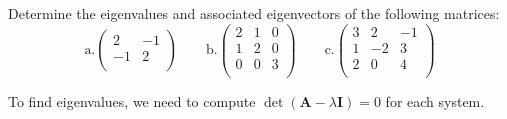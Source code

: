 \documentclass[12pt, answers]{exam}
\newcommand{\ve}[1]{\ensuremath{\mathbf{#1}}}
\begin{document}
\begin{questions}
\vspace*{3em}
\addpoints
\question[10] Determine the eigenvalues and associated eigenvectors of the following matrices:
%
\renewcommand{\aaa}{2}
\renewcommand{\aab}{-1}
\renewcommand{\aba}{-1}
\renewcommand{\abb}{2}
\renewcommand{\baa}{2}
\renewcommand{\bab}{1}
\renewcommand{\bac}{0}
\renewcommand{\bba}{1}
\renewcommand{\bbb}{2}
\renewcommand{\bbc}{0}
\renewcommand{\bca}{0}
\renewcommand{\bcb}{0}
\renewcommand{\bcc}{3}
\renewcommand{\caa}{3}
\renewcommand{\cab}{2}
\renewcommand{\cac}{-1}
\renewcommand{\cba}{1}
\renewcommand{\cbb}{-2}
\renewcommand{\cbc}{3}
\renewcommand{\cca}{2}
\renewcommand{\ccb}{0}
\renewcommand{\ccc}{4}
\begin{equation}
\text{a.} \begin{pmatrix}
   \aaa & \aab \\
   \aba & \abb \\
\end{pmatrix} \qquad
%
\text{b.} \begin{pmatrix}
   \baa & \bab & \bac \\
   \bba & \bbb & \bbc \\
   \bca & \bcb & \bcc \\
\end{pmatrix} \qquad
%
\text{c.} \begin{pmatrix}
  \caa & \cab & \cac \\
  \cba & \cbb & \cbc \\
  \cca & \ccb & \ccc \\
\end{pmatrix} \nonumber
\end{equation}

\begin{solution}
To find eigenvalues, we need to compute $\det(\ve{A} - \lambda \ve{I})=0$ for each system.

\end{solution}
\end{questions}
\end{document}
